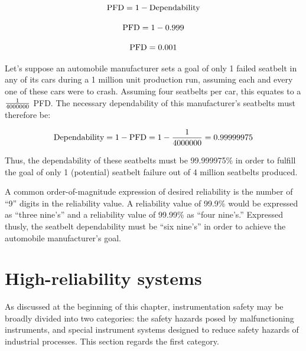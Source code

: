 $$\hbox{PFD} = 1 - \hbox{Dependability}$$

$$\hbox{PFD} = 1 - 0.999$$

$$\hbox{PFD} = 0.001$$

\vskip 10pt

\filbreak

Let's suppose an automobile manufacturer sets a goal of only 1 failed seatbelt in any of its cars during a 1 million unit production run, assuming each and every one of these cars were to crash.  Assuming four seatbelts per car, this equates to a $1 \over 4000000$ PFD.  The necessary dependability of this manufacturer's seatbelts must therefore be:

$$\hbox{Dependability} = 1 - \hbox{PFD} = 1 - {1 \over 4000000}  = 0.99999975$$

Thus, the dependability of these seatbelts must be 99.999975\% in order to fulfill the goal of only 1 (potential) seatbelt failure out of 4 million seatbelts produced.  

\vskip 10pt

A common order-of-magnitude expression of desired reliability is the number of ``9'' digits in the reliability value.  A reliability value of 99.9\% would be expressed as ``three nine's'' and a reliability value of 99.99\% as ``four nine's.''  Expressed thusly, the seatbelt dependability must be ``six nine's'' in order to achieve the automobile manufacturer's goal.











\filbreak
\section{High-reliability systems}

As discussed at the beginning of this chapter, instrumentation safety may be broadly divided into two categories: the safety hazards posed by malfunctioning instruments, and special instrument systems designed to reduce safety hazards of industrial processes.  This section regards the first category.

